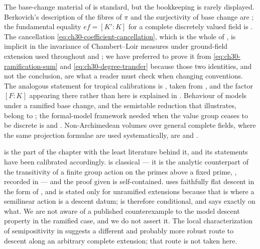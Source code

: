 The base-change material of  is standard, but the
bookkeeping is rarely displayed.  Berkovich's description of the fibres of
\(\pi\) and the surjectivity of base change are \cite[\S1.4 and
\S3.4]{Berk12}; the fundamental equality \(ef=[K':K]\) for a complete
discretely valued field is \cite[Ch.~VI]{ZariskiSamuelII}.  The cancellation
\eqref{eq:ch30-coefficient-cancellation}, which is the whole of
, is implicit in the invariance of Chambert--Loir
measures under ground-field extension used throughout \cite{CL06} and
\cite{GM19}; we have preferred to prove it from
\eqref{eq:ch30-ramification-sum} and
\eqref{eq:ch30-degree-transfer} because those two identities, and not the
conclusion, are what a reader must check when changing conventions.  The
analogous statement for tropical calibrations is
, taken from
\cite[\S13--14]{CLD25}, and the factor \([F:K]\) appearing there rather than
here is explained in .  Behaviour of models under
a ramified base change, and the semistable reduction that
 illustrates, belong to
\cite{deJong1996}; the formal-model framework needed when the value group
ceases to be discrete is \cite{BoschLutkebohmert1993} and
\cite{RaynaudGruson1971}.  Non-Archimedean volumes over general complete
fields, where the same projection formulae are used systematically, are
\cite{BGM21} and \cite{BGGJKM20}.

 is the part of the chapter with the least
literature behind it, and its statements have been calibrated accordingly.
 is classical --- it is the analytic
counterpart of the transitivity of a finite group action on the primes above
a fixed prime, \cite[Tag 0BRI]{stacks-project}, recorded in
 --- and the proof given is self-contained.
 uses faithfully flat descent in the form of
\cite[Exp.~VIII]{SGA1}, and is stated only for unramified extensions
because that is where a semilinear action is a descent datum;
 is therefore conditional, and
 says exactly on what.  We are not aware of a
published counterexample to the model descent property in the ramified case,
and we do not assert it.  The local characterization of semipositivity in
\cite{GM19} suggests a different and probably more robust route to descent
along an arbitrary complete extension; that route is not taken here.

